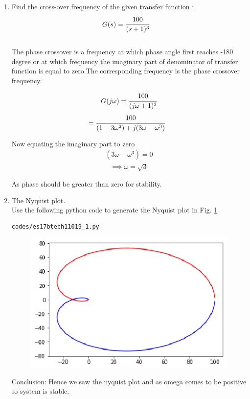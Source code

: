 \begin{enumerate}[label=\thesection.\arabic*.,ref=\thesection.\theenumi]

\item  Find the cross-over frequency of the  given transfer function :
\begin{align}
\label{eq:es17btech11019_system}
G(s) &= \cfrac{100}{(s+1)^3}
\end{align}
\\
\solution The phase crossover is a frequency at which phase angle first reaches -180 degree or at which frequency the imaginary part of denominator of transfer function is equal to zero.The corresponding frequency is the phase crossover frequency.


\begin{align}
G(j\omega)=\cfrac{100}{(j\omega+1)^3}
\end{align}
\begin{align}
 &= \cfrac{100}{(1-3\omega^2)+j(3\omega-\omega^3)}
\end{align}
     
Now equating the imaginary part to zero
\begin{align}
(3\omega-\omega^3)=0
\end{align}  
\begin{align}
\implies \omega = \sqrt{3}
\end{align}

As phase should be greater than zero for stability.

\item The Nyquist plot.
\\
\solution Use the following python code to generate the Nyquist plot in Fig.  \ref{fig:es17btech11019}
\begin{lstlisting}
codes/es17btech11019_1.py
\end{lstlisting}
%
\begin{figure}[!h]
  \includegraphics[width=\columnwidth]{./figs/es17btech11019.eps}
  \caption{}
  \label{fig:es17btech11019}
\end{figure}


Conclusion: Hence we saw the nyquist plot and as omega comes to be positive so system is stable.


\end{enumerate}
